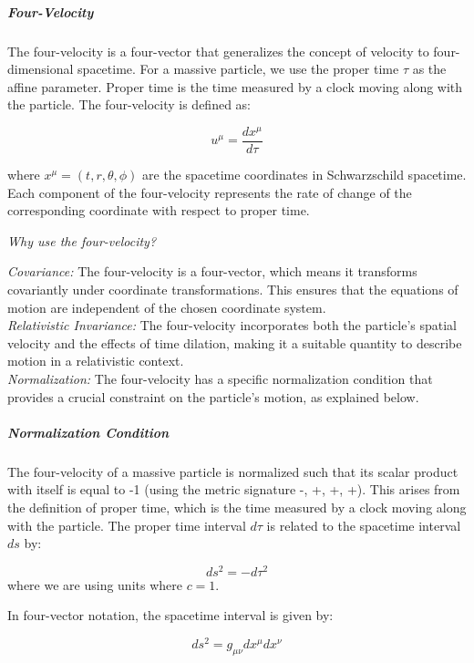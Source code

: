 \subparagraph{Four-Velocity}

The four-velocity is a four-vector that generalizes the concept of velocity to four-dimensional spacetime. For a massive particle, we use the proper time \(\tau\) as the affine parameter. Proper time is the time measured by a clock moving along with the particle. The four-velocity is defined as:

\begin{equation}
u^\mu = \frac{dx^\mu}{d\tau}
\end{equation}

where \(x^\mu = (t, r, \theta, \phi)\) are the spacetime coordinates in Schwarzschild spacetime. Each component of the four-velocity represents the rate of change of the corresponding coordinate with respect to proper time.

\textit{Why use the four-velocity?}

\textit{Covariance:} The four-velocity is a four-vector, which means it transforms covariantly under coordinate transformations. This ensures that the equations of motion are independent of the chosen coordinate system.\\
\textit{Relativistic Invariance:} The four-velocity incorporates both the particle's spatial velocity and the effects of time dilation, making it a suitable quantity to describe motion in a relativistic context.\\
\textit{Normalization:} The four-velocity has a specific normalization condition that provides a crucial constraint on the particle's motion, as explained below.

\subparagraph{Normalization Condition}

The four-velocity of a massive particle is normalized such that its scalar product with itself is equal to -1 (using the metric signature -, +, +, +). This arises from the definition of proper time, which is the time measured by a clock moving along with the particle. The proper time interval \(d\tau\) is related to the spacetime interval \(ds\) by:

\begin{equation}
ds^2 = - d\tau^2
\end{equation}
where we are using units where $c=1$.

In four-vector notation, the spacetime interval is given by:

\begin{equation}
ds^2 = g_{\mu\nu} dx^\mu dx^\nu
\end{equation}

